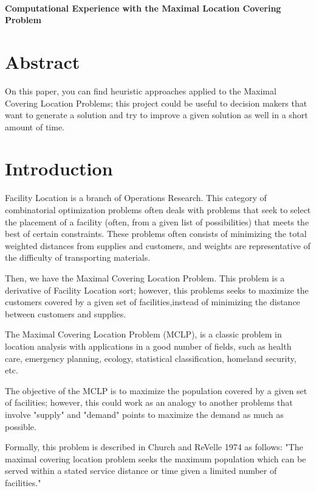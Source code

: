 \documentclass[11pt, a4paper]{article}
\newcommand{\Title}[1]{{\LARGE \centering \hrulefill\\ \textbf{#1}\\ \hrulefill}}
\begin{document}
\pagestyle{plain}


\onehalfspacing
\setcounter{page}{1}
\Title{Computational Experience with the Maximal Location Covering Problem}

\section*{Abstract}
{\small \singlespacing
	On this paper, you can find heuristic approaches applied to the Maximal Covering Location Problems; this project could be useful to decision makers that want to generate a solution and try to improve a given solution as well in a short amount of time.  
}

\section{Introduction}\label{sec:intro}
Facility Location is a branch of Operations Research. This category of combinatorial optimization problems often deals with problems that seek to select the placement of a facility (often, from a given list of possibilities) that meets the best of certain constraints. These problems often consists of minimizing the total weighted distances from supplies and customers, and weights are representative of the difficulty of transporting materials. 

Then, we have the Maximal Covering Location Problem. This problem is a derivative of Facility Location sort; however, this problems seeks to maximize the customers covered by a given set of facilities,instead of minimizing the distance between customers and supplies. 

The Maximal Covering Location Problem (MCLP), is a classic problem in location analysis with    applications in a good number of fields, such as health care, emergency planning, ecology, statistical classification, homeland security, etc.

The objective of the MCLP is to maximize the population covered by a given set of facilities; however, this could work as an analogy to another problems that involve "supply" and "demand" points to maximize the demand as much as possible.

Formally, this problem is described in Church and ReVelle 1974 as follows:
"The maximal covering location problem seeks the maximum population which can be served within a stated service distance or time given a limited number of facilities."
\end{document}
